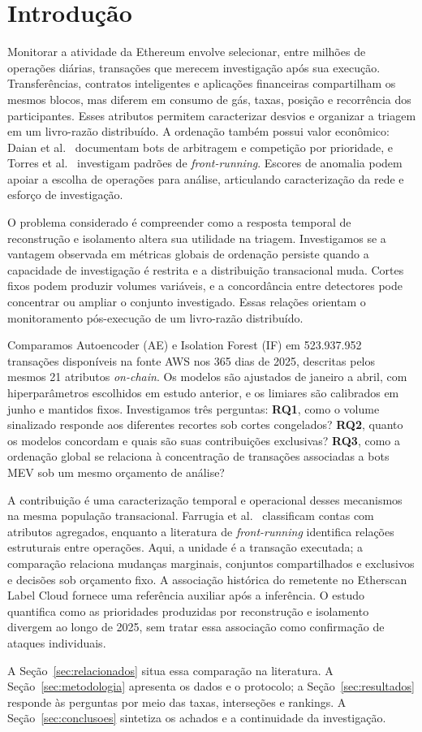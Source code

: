 \section{Introdução}
\label{sec:introducao}
Monitorar a atividade da Ethereum envolve selecionar, entre milhões de operações diárias, transações que merecem investigação após sua execução. Transferências, contratos inteligentes e aplicações financeiras compartilham os mesmos blocos, mas diferem em consumo de gás, taxas, posição e recorrência dos participantes. Esses atributos permitem caracterizar desvios e organizar a triagem em um livro-razão distribuído. A ordenação também possui valor econômico: Daian et al.\ \cite{Daian2020} documentam bots de arbitragem e competição por prioridade, e Torres et al.\ \cite{Torres2021} investigam padrões de \textit{front-running}. Escores de anomalia podem apoiar a escolha de operações para análise, articulando caracterização da rede e esforço de investigação.

O problema considerado é compreender como a resposta temporal de reconstrução e isolamento altera sua utilidade na triagem. Investigamos se a vantagem observada em métricas globais de ordenação persiste quando a capacidade de investigação é restrita e a distribuição transacional muda. Cortes fixos podem produzir volumes variáveis, e a concordância entre detectores pode concentrar ou ampliar o conjunto investigado. Essas relações orientam o monitoramento pós-execução de um livro-razão distribuído.

Comparamos Autoencoder (AE) e Isolation Forest (IF) em 523.937.952 transações disponíveis na fonte AWS nos 365 dias de 2025, descritas pelos mesmos 21 atributos \textit{on-chain}. Os modelos são ajustados de janeiro a abril, com hiperparâmetros escolhidos em estudo anterior, e os limiares são calibrados em junho e mantidos fixos. Investigamos três perguntas: \textbf{RQ1}, como o volume sinalizado responde aos diferentes recortes sob cortes congelados? \textbf{RQ2}, quanto os modelos concordam e quais são suas contribuições exclusivas? \textbf{RQ3}, como a ordenação global se relaciona à concentração de transações associadas a bots MEV sob um mesmo orçamento de análise?

A contribuição é uma caracterização temporal e operacional desses mecanismos na mesma população transacional. Farrugia et al.\ \cite{Farrugia2020} classificam contas com atributos agregados, enquanto a literatura de \textit{front-running} identifica relações estruturais entre operações. Aqui, a unidade é a transação executada; a comparação relaciona mudanças marginais, conjuntos compartilhados e exclusivos e decisões sob orçamento fixo. A associação histórica do remetente no Etherscan Label Cloud fornece uma referência auxiliar após a inferência. O estudo quantifica como as prioridades produzidas por reconstrução e isolamento divergem ao longo de 2025, sem tratar essa associação como confirmação de ataques individuais.

A Seção~\ref{sec:relacionados} situa essa comparação na literatura. A Seção~\ref{sec:metodologia} apresenta os dados e o protocolo; a Seção~\ref{sec:resultados} responde às perguntas por meio das taxas, interseções e rankings. A Seção~\ref{sec:conclusoes} sintetiza os achados e a continuidade da investigação.
